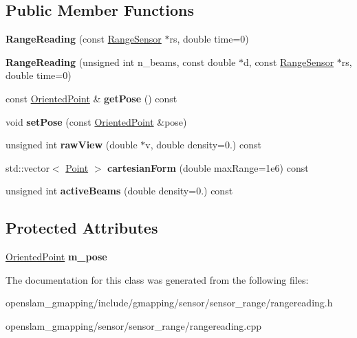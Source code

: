 \subsection*{Public Member Functions}
\begin{DoxyCompactItemize}
\item 
\mbox{\label{classGMapping_1_1RangeReading_afd3cc81a7d26c4d141e7fb2b67b39de5}} 
{\bfseries Range\+Reading} (const \hyperlink{classGMapping_1_1RangeSensor}{Range\+Sensor} $\ast$rs, double time=0)
\item 
\mbox{\label{classGMapping_1_1RangeReading_ab004e5752633c773410cc78e8578b218}} 
{\bfseries Range\+Reading} (unsigned int n\+\_\+beams, const double $\ast$d, const \hyperlink{classGMapping_1_1RangeSensor}{Range\+Sensor} $\ast$rs, double time=0)
\item 
\mbox{\label{classGMapping_1_1RangeReading_a397a6492e1759f0623c7a3ceb7e549c3}} 
const \hyperlink{structGMapping_1_1orientedpoint}{Oriented\+Point} \& {\bfseries get\+Pose} () const
\item 
\mbox{\label{classGMapping_1_1RangeReading_a14bd6d1fe87196ffeb2b78f2d69500fc}} 
void {\bfseries set\+Pose} (const \hyperlink{structGMapping_1_1orientedpoint}{Oriented\+Point} \&pose)
\item 
\mbox{\label{classGMapping_1_1RangeReading_a567ac887823c73ca3d1da3d04df678dc}} 
unsigned int {\bfseries raw\+View} (double $\ast$v, double density=0.) const
\item 
\mbox{\label{classGMapping_1_1RangeReading_af6a18cc22892ffc409805066d6455fcb}} 
std\+::vector$<$ \hyperlink{structGMapping_1_1point}{Point} $>$ {\bfseries cartesian\+Form} (double max\+Range=1e6) const
\item 
\mbox{\label{classGMapping_1_1RangeReading_a7bf8e17ff306e0085ea6312e68471c50}} 
unsigned int {\bfseries active\+Beams} (double density=0.) const
\end{DoxyCompactItemize}
\subsection*{Protected Attributes}
\begin{DoxyCompactItemize}
\item 
\mbox{\label{classGMapping_1_1RangeReading_a2ee201c5ff8b2875904ca696234865e6}} 
\hyperlink{structGMapping_1_1orientedpoint}{Oriented\+Point} {\bfseries m\+\_\+pose}
\end{DoxyCompactItemize}


The documentation for this class was generated from the following files\+:\begin{DoxyCompactItemize}
\item 
openslam\+\_\+gmapping/include/gmapping/sensor/sensor\+\_\+range/rangereading.\+h\item 
openslam\+\_\+gmapping/sensor/sensor\+\_\+range/rangereading.\+cpp\end{DoxyCompactItemize}
